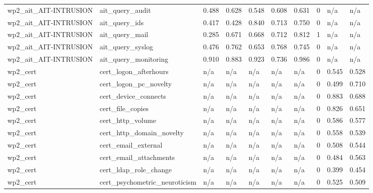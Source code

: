 \begin{table}[!ht]
{\begin{tabular}{llllllllll}
wp2\_ait\_AIT-INTRUSION & ait\_query\_audit & 0.488 & 0.628 & 0.548 & 0.608 & 0.631 & 0 & n/a & n/a \\
wp2\_ait\_AIT-INTRUSION & ait\_query\_ids & 0.417 & 0.428 & 0.840 & 0.713 & 0.750 & 0 & n/a & n/a \\
wp2\_ait\_AIT-INTRUSION & ait\_query\_mail & 0.285 & 0.671 & 0.668 & 0.712 & 0.812 & 1 & n/a & n/a \\
wp2\_ait\_AIT-INTRUSION & ait\_query\_syslog & 0.476 & 0.762 & 0.653 & 0.768 & 0.745 & 0 & n/a & n/a \\
wp2\_ait\_AIT-INTRUSION & ait\_query\_monitoring & 0.910 & 0.883 & 0.923 & 0.736 & 0.986 & 0 & n/a & n/a \\
wp2\_cert & cert\_logon\_afterhours & n/a & n/a & n/a & n/a & n/a & 0 & 0.545 & 0.528 \\
wp2\_cert & cert\_logon\_pc\_novelty & n/a & n/a & n/a & n/a & n/a & 0 & 0.499 & 0.710 \\
wp2\_cert & cert\_device\_connects & n/a & n/a & n/a & n/a & n/a & 0 & 0.883 & 0.688 \\
wp2\_cert & cert\_file\_copies & n/a & n/a & n/a & n/a & n/a & 0 & 0.826 & 0.651 \\
wp2\_cert & cert\_http\_volume & n/a & n/a & n/a & n/a & n/a & 0 & 0.586 & 0.577 \\
wp2\_cert & cert\_http\_domain\_novelty & n/a & n/a & n/a & n/a & n/a & 0 & 0.558 & 0.539 \\
wp2\_cert & cert\_email\_external & n/a & n/a & n/a & n/a & n/a & 0 & 0.508 & 0.544 \\
wp2\_cert & cert\_email\_attachments & n/a & n/a & n/a & n/a & n/a & 0 & 0.484 & 0.563 \\
wp2\_cert & cert\_ldap\_role\_change & n/a & n/a & n/a & n/a & n/a & 0 & 0.399 & 0.454 \\
wp2\_cert & cert\_psychometric\_neuroticism & n/a & n/a & n/a & n/a & n/a & 0 & 0.525 & 0.509 \\
\bottomrule
\end{tabular}}
\end{table}
